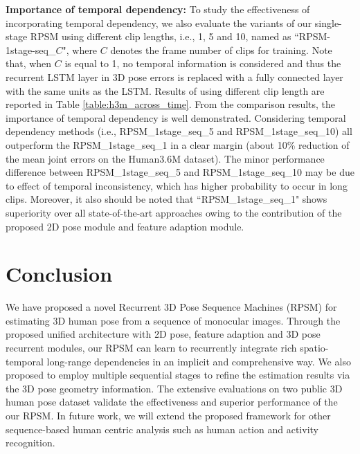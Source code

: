\documentclass[10pt,twocolumn,letterpaper]{article}
\begin{document}
\textbf{Importance of temporal dependency:} To study the effectiveness of incorporating temporal dependency, we also evaluate the variants of our single-stage RPSM using different clip lengths, i.e., 1, 5 and 10, named as ``RPSM-1stage-seq\_$C$", where $C$ denotes the frame number of clips for training. Note that, when $C$ is equal to 1, no temporal information is considered and thus the recurrent LSTM layer in 3D pose errors is replaced with a fully connected layer with the same units as the LSTM. 
Results of using different clip length are reported in Table \ref{table:h3m_across_time}. From the comparison results, the importance of temporal dependency is well demonstrated. Considering temporal dependency methods (i.e., RPSM\_1stage\_seq\_5 and RPSM\_1stage\_seq\_10) all outperform the RPSM\_1stage\_seq\_1 in a clear margin (about 10\% reduction of the mean joint errors on the Human3.6M dataset). The minor performance difference between RPSM\_1stage\_seq\_5 and RPSM\_1stage\_seq\_10 may be due to effect of temporal inconsistency, which has higher probability to occur in long clips. 
Moreover, it also should be noted that ``RPSM\_1stage\_seq\_1" shows superiority over all state-of-the-art approaches owing to the contribution of the proposed 2D pose module and feature adaption module.







\section{Conclusion}
We have proposed a novel Recurrent 3D Pose Sequence Machines (RPSM) for estimating 3D human pose from a sequence of monocular images. Through the proposed unified architecture with 2D pose, feature adaption and 3D pose recurrent modules, our RPSM can learn to recurrently integrate rich spatio-temporal long-range dependencies in an implicit and comprehensive way. We also proposed to employ multiple sequential stages to refine the estimation results via the 3D pose geometry information. The extensive evaluations on two public 3D human pose dataset validate the effectiveness and superior performance of the our RPSM. In future work, we will extend the proposed framework for other sequence-based human centric analysis such as human action and activity recognition.

{\small


}
\end{document}
